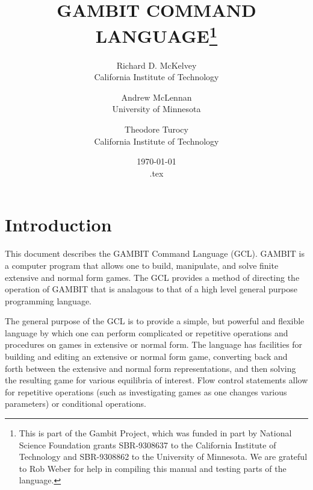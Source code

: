%
%
%
\renewcommand{\baselinestretch}{.9}
\newcommand{\bd}{\begin{description}}
\newcommand{\ed}{\end{description}}


\title{GAMBIT COMMAND LANGUAGE\thanks{This is part of the Gambit
Project, which was funded in part by National Science Foundation
grants SBR-9308637 to the California Institute of Technology and
SBR-9308862 to the University of Minnesota.  We are grateful to Rob
Weber for help in compiling this manual and testing parts of the
language.}}

\author{Richard D. McKelvey\\California Institute of
Technology
\and
Andrew McLennan\\University of
Minnesota
\and 
Theodore Turocy\\California Institute of Technology
}

\date{\today\\ \jobname.tex}

\maketitle

\tableofcontents

\section{Introduction}

This document describes the GAMBIT Command Language (GCL).  GAMBIT is
a computer program that allows one to build, manipulate, and solve
finite extensive and normal form games. The GCL provides a method of
directing the operation of GAMBIT that is analagous to that of a high
level general purpose programming language.

The general purpose of the GCL is to provide a simple, but powerful
and flexible language by which one can perform complicated or
repetitive operations and procedures on games in extensive or normal
form.  The language has facilities for building and editing an
extensive or normal form game, converting back and forth between the
extensive and normal form representations, and then solving the
resulting game for various equilibria of interest. Flow
control statements allow for repetitive operations (such as
investigating games as one changes various parameters) or conditional
operations.


